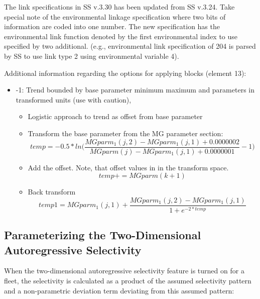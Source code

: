 The link specifications in SS v.3.30 has been updated from SS v.3.24. Take special note of the environmental linkage specification where two bits of information are coded into one number. The new specification has the environmental link function denoted by the first environmental index to use specified by two additional. (e.g., environmental link specification of 204 is parsed by SS to use link type 2 using environmental variable 4).



Additional information regarding the options for applying blocks (element 13):
\begin{itemize} 
	\item -1: Trend bounded by base parameter minimum maximum and parameters in transformed units (use with caution),
	\begin{itemize}
		\item Logistic approach to trend as offset from base parameter
		\item Transform the base parameter from the MG parameter section:
		\begin{equation}
			temp = -0.5*ln\Bigg(\frac{MGparm_1(j,2)-MGparm_1(j,1)+0.0000002}{MGparm(j)-MGparm_1(j,1)+0.0000001}-1\Bigg)
		\end{equation}
		\item Add the offset. Note, that offset values in in the transform space.
		\begin{equation}
			temp += MGparm(k+1)
		\end{equation}
		\item Back transform
		\begin{equation}
			temp1 = MGparm_1(j,1)+\frac{MGparm_1(j,2)-MGparm_1(j,1)}{1+e^{-2*temp}}
		\end{equation}			
	\end{itemize}
\end{itemize}

\hypertarget{2DAR}{}
\subsection{Parameterizing the Two-Dimensional Autoregressive Selectivity}
When the two-dimensional autoregressive selectivity feature is turned on for a fleet, the selectivity is calculated as a product of the assumed selectivity pattern and a non-parametric deviation term deviating from this assumed pattern:

